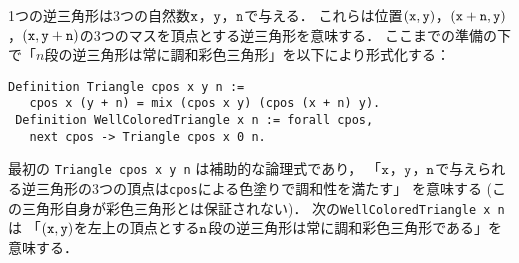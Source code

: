 1つの逆三角形は3つの自然数${\tt x}$，${\tt y}$，${\tt n}$で与える．
これらは位置$({\tt x},{\tt y})$，$({\tt x}+{\tt n},{\tt y})$，$({\tt x},{\tt y}+{\tt n})$の3つのマスを頂点とする逆三角形を意味する．
ここまでの準備の下で「$n$段の逆三角形は常に調和彩色三角形」を以下により形式化する：
\begin{lstlisting}[language=Coq]
 Definition Triangle cpos x y n :=
   cpos x (y + n) = mix (cpos x y) (cpos (x + n) y).
 Definition WellColoredTriangle x n := forall cpos,
   next cpos -> Triangle cpos x 0 n.
\end{lstlisting}
最初の {\tt Triangle cpos x y n} は補助的な論理式であり，
「${\tt x}$，${\tt y}$，${\tt n}$で与えられる逆三角形の3つの頂点は{\tt cpos}による色塗りで調和性を満たす」
を意味する (この三角形自身が彩色三角形とは保証されない)．
次の{\tt WellColoredTriangle x n} は
「$({\tt x},{\tt y})$を左上の頂点とする${\tt n}$段の逆三角形は常に調和彩色三角形である」を意味する．






